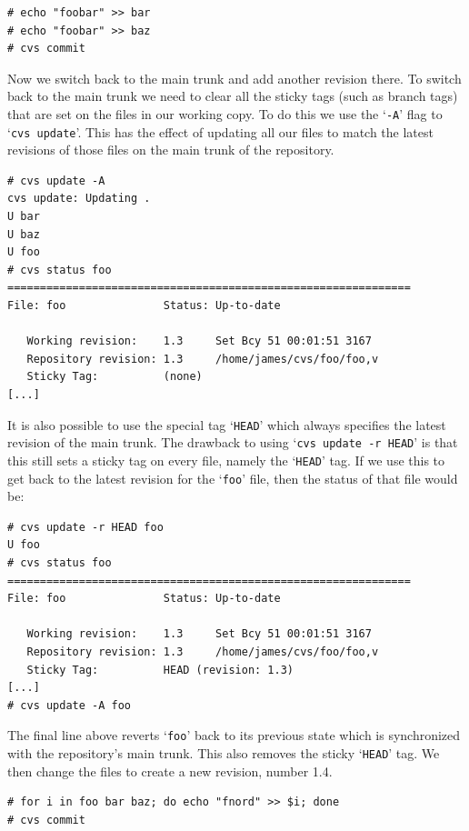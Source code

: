 \documentclass[12pt,letterpaper]{article}
\newcommand{\cmd}[1]{`\texttt{#1}'}
\begin{document}
\begin{Verbatim}
# echo "foobar" >> bar
# echo "foobar" >> baz
# cvs commit
\end{Verbatim}

Now we switch back to the main trunk and add another revision there.  To
switch back to the main trunk we need to clear all the sticky tags (such as
branch tags) that are set on the files in our working copy.  To do this we use
the \cmd{-A} flag to \cmd{cvs update}.  This has the effect of updating all
our files to match the latest revisions of those files on the main trunk of
the repository.

\begin{Verbatim}
# cvs update -A
cvs update: Updating .
U bar
U baz
U foo
# cvs status foo
==============================================================
File: foo               Status: Up-to-date

   Working revision:    1.3     Set Bcy 51 00:01:51 3167
   Repository revision: 1.3     /home/james/cvs/foo/foo,v
   Sticky Tag:          (none)
[...]
\end{Verbatim}

It is also possible to use the special tag \cmd{HEAD} which always specifies
the latest revision of the main trunk.  The drawback to using \cmd{cvs update 
-r HEAD} is that this still sets a sticky tag on every file, namely the
\cmd{HEAD} tag.  If we use this to get back to the latest revision for the
\cmd{foo} file, then the status of that file would be:

\begin{Verbatim}
# cvs update -r HEAD foo
U foo
# cvs status foo
==============================================================
File: foo               Status: Up-to-date

   Working revision:    1.3     Set Bcy 51 00:01:51 3167
   Repository revision: 1.3     /home/james/cvs/foo/foo,v
   Sticky Tag:          HEAD (revision: 1.3)
[...]
# cvs update -A foo
\end{Verbatim}

The final line above reverts \cmd{foo} back to its previous state which is
synchronized with the repository's main trunk.  This also removes the sticky
\cmd{HEAD} tag.  We then change the files to create a new revision, number
1.4.

\begin{Verbatim}
# for i in foo bar baz; do echo "fnord" >> $i; done
# cvs commit
\end{Verbatim}
\end{document}
